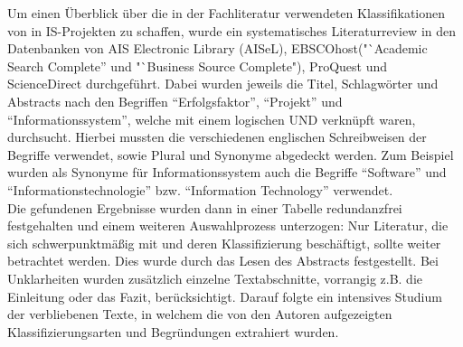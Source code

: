 Um einen Überblick über die in der Fachliteratur verwendeten Klassifikationen von \EF in IS-Projekten zu schaffen, wurde ein 
systematisches Literaturreview in den Datenbanken von AIS Electronic Library (AISeL), 
EBSCOhost("`Academic Search Complete” und "`Business Source Complete"), ProQuest und ScienceDirect durchgeführt.
Dabei wurden jeweils die Titel, Schlagwörter und Abstracts nach den Begriffen 
"`Erfolgsfaktor"', "`Projekt"' und "`Informationssystem"', welche mit einem logischen UND verknüpft waren, durchsucht. 
Hierbei mussten die verschiedenen englischen Schreibweisen der Begriffe verwendet, sowie Plural und Synonyme abgedeckt werden.
Zum Beispiel wurden als Synonyme für Informationssystem auch die Begriffe "`Software"' und "`Informationstechnologie"' bzw. "`Information Technology"' verwendet.\\
Die gefundenen Ergebnisse wurden dann in einer Tabelle redundanzfrei festgehalten und einem weiteren Auswahlprozess unterzogen:
Nur Literatur, die sich schwerpunktmäßig mit \EF und deren Klassifizierung beschäftigt, sollte weiter betrachtet werden.
Dies wurde durch das Lesen des Abstracts festgestellt. Bei Unklarheiten wurden zusätzlich einzelne Textabschnitte,
vorrangig z.B. die Einleitung oder das Fazit, berücksichtigt.
Darauf folgte ein intensives Studium der verbliebenen Texte, in welchem die von den Autoren aufgezeigten Klassifizierungsarten und Begründungen extrahiert wurden.
